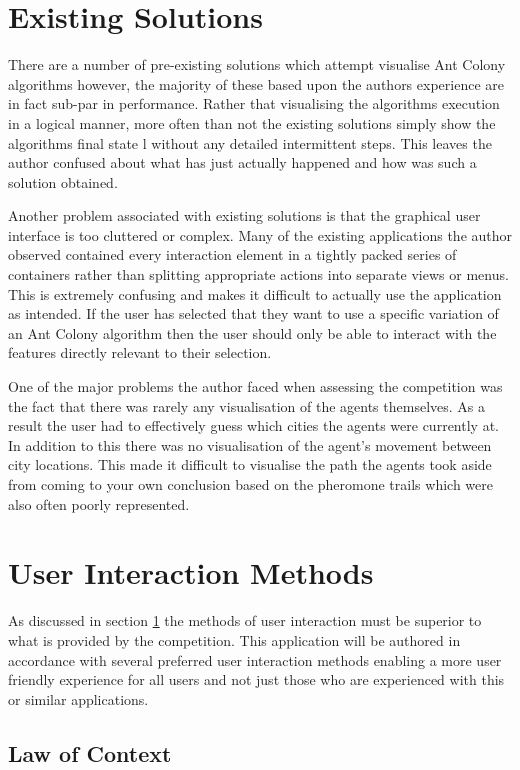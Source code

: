 \section{Existing Solutions}
\label{existingsolutions}
There are a number of pre-existing solutions which attempt visualise Ant Colony algorithms however, the majority of these based upon the authors experience are in fact sub-par in performance. Rather that visualising the algorithms execution in a logical manner, more often than not the existing solutions simply show the algorithms final state l without any detailed intermittent steps. This leaves the author confused about what has just actually happened and how was such a solution obtained.

Another problem associated with existing solutions is that the graphical user interface is too cluttered or complex. Many of the existing applications the author observed contained every interaction element in a tightly packed series of containers rather than splitting appropriate actions into separate views or menus. This is extremely confusing and makes it difficult to actually use the application as intended. If the user has selected that they want to use a specific variation of an Ant Colony algorithm then the user should only be able to interact with the features directly relevant to their selection.

One of the major problems the author faced when assessing the competition was the fact that there was rarely any visualisation of the agents themselves. As a result the user had to effectively guess which cities the agents were currently at. In addition to this there was no visualisation of the agent’s movement between city locations. This made it difficult to visualise the path the agents took aside from coming to your own conclusion based on the pheromone trails which were also often poorly represented.

\section{User Interaction Methods}
\label{uiMethods}
As discussed in section \ref{existingsolutions} the methods of user interaction must be superior to what is provided by the competition. This application will be authored in accordance with several preferred user interaction methods enabling a more user friendly experience for all users and not just those who are experienced with this or similar applications.

\subsection{Law of Context}


